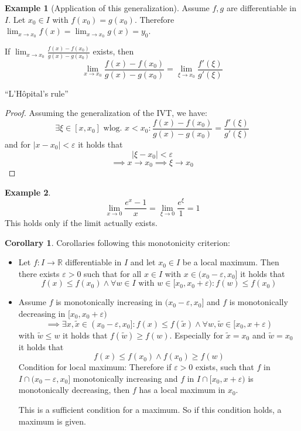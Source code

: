 \documentclass[a4paper,landscape,twocolumn]{article}
\theoremstyle{definition}
\newtheorem{ex}{Example}
\newtheorem{cor}{Corollary}
\newcommand\abs[1]{\left|#1\right|}
\begin{document}
\begin{ex}[Application of this generalization]
  Assume $f,g$ are differentiable in $I$. Let $x_0 \in I$ with $f(x_0) = g(x_0)$.
  Therefore $\lim_{x\to x_0} f(x) = \lim_{x\to x_0} g(x) = y_0$.

  If $\lim_{x\to x_0} \frac{f(x) - f(x_0)}{g(x) - g(x_0)}$ exists, then
  \[ \lim_{x\to x_0} \frac{f(x) - f(x_0)}{g(x) - g(x_0)} = \lim_{\xi \to x_0} \frac{f'(\xi)}{g'(\xi)} \]
  \begin{center}
    \enquote{L'Hôpital's rule}
  \end{center}
\end{ex}
\begin{proof}
  Assuming the generalization of the IVT, we have:
  \[ \exists \xi \in [x, x_0] \text{ wlog. } x < x_0: \frac{f(x) - f(x_0)}{g(x) - g(x_0)} = \frac{f'(\xi)}{g'(\xi)} \]
  and for $\abs{x - x_0} < \varepsilon$ it holds that
  \[ \abs{\xi - x_0} < \varepsilon \]
  \[ \implies x \to x_0 \implies \xi \to x_0 \]
\end{proof}
\begin{ex}
  \[ \lim_{x\to 0} \frac{e^x - 1}{x} = \lim_{\xi \to 0} \frac{e^\xi}{1} = 1 \]
  This holds only if the limit actually exists.
\end{ex}
\begin{cor}
  Corollaries following this monotonicity criterion:
  \begin{itemize}
    \item Let $f: I \to \mathbb R$ differentiable in $I$ and let $x_0 \in I$ be a local maximum.
      Then there exists $\varepsilon > 0$ such that for all $x \in I$ with $x \in
      (x_0 - \varepsilon, x_0]$ it holds that
      \[ f(x) \leq f(x_0) \land \forall w \in I \text{ with } w \in [x_0, x_0 + \varepsilon): f(w) \leq f(x_0) \]
    \item Assume $f$ is monotonically increasing in $(x_0 - \varepsilon, x_0]$ and $f$ is monotonically decreasing
      in $[x_0, x_0 + \varepsilon)$
      \[ \implies \exists x, \tilde{x} \in (x_0 - \varepsilon, x_0]: f(x) \leq f(\tilde{x}) \land \forall w, \tilde{w} \in [x_0, x + \varepsilon) \]
      with $\tilde{w} \leq w$ it holds that $f(\tilde{w}) \geq f(w)$.
      Especially for $\tilde{x} = x_0$ and $\tilde{w} = x_0$ it holds that
      \[ f(x) \leq f(x_0) \land f(x_0) \geq f(w) \]
      Condition for local maximum: Therefore if $\varepsilon > 0$ exists,
      such that $f$ in $I \cap (x_0 - \varepsilon, x_0]$ monotonically increasing
      and $f$ in $I \cap [x_0, x + \varepsilon)$ is monotonically decreasing,
      then $f$ has a local maximum in $x_0$.

      This is a sufficient condition for a maximum. So if this condition holds,
      a maximum is given.
  \end{itemize}
\end{cor}
\end{document}

